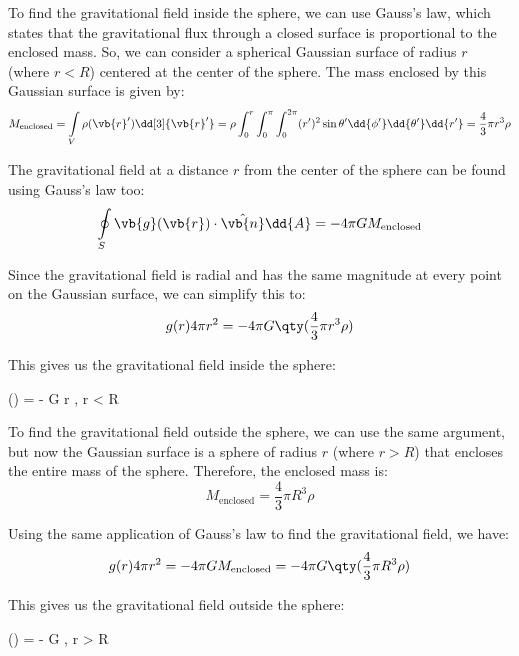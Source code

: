 To find the gravitational field inside the sphere, we can use Gauss's law, which states that the gravitational flux through a closed surface is proportional to the enclosed mass. So, we can consider a spherical Gaussian surface of radius $r$ (where $r < R$) centered at the center of the sphere. The mass enclosed by this Gaussian surface is given by:
\begin{equation*}
    M_{\text{enclosed}} = \int\limits_{V} \rho(\vb{r}') \dd[3]{\vb{r}'} = \rho \int_{0}^{r} \int_{0}^{\pi} \int_{0}^{2\pi} (r')^{2} \sin\theta' \dd{\phi'} \dd{\theta'} \dd{r'} = \frac{4}{3} \pi r^{3} \rho
\end{equation*}

The gravitational field at a distance $r$ from the center of the sphere can be found using Gauss's law too:
\begin{equation*}
    \oint\limits_{S} \vb{g}(\vb{r}) \cdot \hat{\vb{n}} \dd{A} = -4\pi G M_{\text{enclosed}}
\end{equation*}

Since the gravitational field is radial and has the same magnitude at every point on the Gaussian surface, we can simplify this to:
\begin{equation*}
    g(r) 4\pi r^{2} = -4\pi G \qty(\frac{4}{3} \pi r^{3} \rho)
\end{equation*}

This gives us the gravitational field inside the sphere:
\begin{answer}
    () = - \pi G \rho r , \quad {} r < R
\end{answer}

To find the gravitational field outside the sphere, we can use the same argument, but now the Gaussian surface is a sphere of radius $r$ (where $r > R$) that encloses the entire mass of the sphere. Therefore, the enclosed mass is:
\begin{equation*}
    M_{\text{enclosed}} = \frac{4}{3} \pi R^{3} \rho
\end{equation*}

Using the same application of Gauss's law to find the gravitational field, we have:
\begin{equation*}
    g(r) 4\pi r^{2} = -4\pi G M_{\text{enclosed}} = -4\pi G \qty(\frac{4}{3} \pi R^{3} \rho)
\end{equation*}

This gives us the gravitational field outside the sphere:
\begin{answer}
    () = - \pi G \rho {} , \quad {} r > R
\end{answer}

\endex